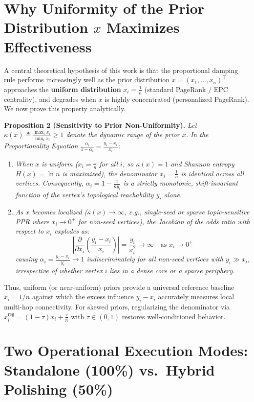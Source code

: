 \documentclass[11pt, a4paper]{article}
\begin{document}
\section{Why Uniformity of the Prior Distribution $x$ Maximizes Effectiveness}

A central theoretical hypothesis of this work is that the proportional damping rule performs increasingly well as the prior distribution $x = (x_1, \dots, x_n)^\top$ approaches the \textbf{uniform distribution} $x_i = \frac{1}{n}$ (standard PageRank / EPC centrality), and degrades when $x$ is highly concentrated (personalized PageRank). We now prove this property analytically.

\noindent\textbf{Proposition 2 (Sensitivity to Prior Non-Uniformity).} \textit{Let $\kappa(x) \triangleq \frac{\max_i x_i}{\min_i x_i} \ge 1$ denote the dynamic range of the prior $x$. In the Proportionality Equation $\frac{\alpha_i}{1 - \alpha_i} = \frac{y_i - x_i}{x_i}$:}
\begin{enumerate}
    \item \textit{When $x$ is uniform ($x_i = \frac{1}{n}$ for all $i$, so $\kappa(x) = 1$ and Shannon entropy $H(x) = \ln n$ is maximized), the denominator $x_i = \frac{1}{n}$ is identical across all vertices. Consequently, $\alpha_i = 1 - \frac{1}{n y_i}$ is a strictly monotonic, shift-invariant function of the vertex's topological reachability $y_i$ alone.}
    \item \textit{As $x$ becomes localized ($\kappa(x) \to \infty$, e.g., single-seed or sparse topic-sensitive PPR where $x_i \to 0^+$ for non-seed vertices), the Jacobian of the odds ratio with respect to $x_i$ explodes as:}
    \[
    \left|\frac{\partial}{\partial x_i}\left(\frac{y_i - x_i}{x_i}\right)\right| = \frac{y_i}{x_i^2} \to \infty \quad \text{as } x_i \to 0^+
    \]
    \textit{causing $\alpha_i = \frac{y_i - x_i}{y_i} \to 1$ indiscriminately for all non-seed vertices with $y_i \gg x_i$, irrespective of whether vertex $i$ lies in a dense core or a sparse periphery.}
\end{enumerate}

Thus, uniform (or near-uniform) priors provide a universal reference baseline $x_i = 1/n$ against which the excess influence $y_i - x_i$ accurately measures local multi-hop connectivity. For skewed priors, regularizing the denominator via $x_i^{\mathrm{reg}} = (1 - \tau) x_i + \frac{\tau}{n}$ with $\tau \in (0, 1)$ restores well-conditioned behavior.

\section{Two Operational Execution Modes: Standalone (100\%) vs.\ Hybrid Polishing (50\%)}
\end{document}
